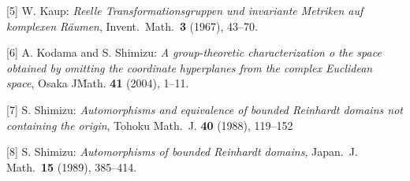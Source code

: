 \item{[5]} W. Kaup:  {\it Reelle Transformationsgruppen und invariante Metriken auf komplexen R\"aumen},  Invent.\ Math.\ {\bf 3} (1967), 43--70.
\item{[6]} A. Kodama and S. Shimizu:  {\it A group-theoretic characterization o
the space obtained by omitting the coordinate hyperplanes
from the complex Euclidean space},  Osaka J\. Math. {\bf 41} (2004), 1--11.
\item{[7]} S. Shimizu:  {\it Automorphisms and equivalence of bounded Reinhardt domains not containing the origin},  Tohoku Math.\ J. {\bf 40} (1988), 119--152
\item{[8]} S. Shimizu:  {\it Automorphisms of bounded Reinhardt domains},  Japan.\ J. Math.\ {\bf 15} (1989), 385--414.
\enddocument
